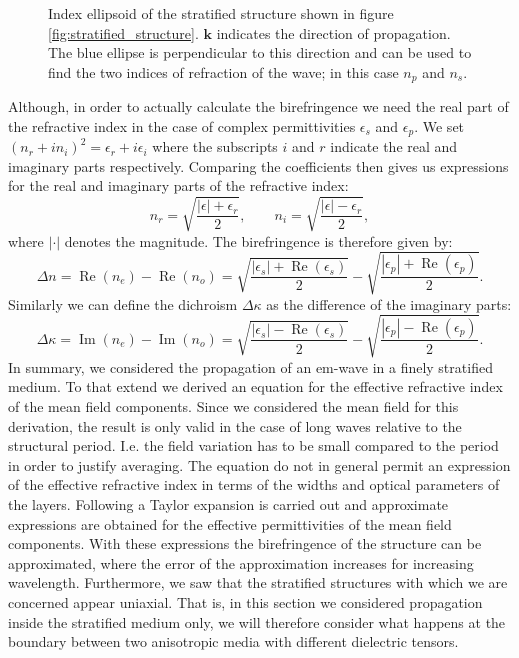 \begin{figure}[h]
    \centering
    
    \caption{Index ellipsoid of the stratified structure shown in figure \ref{fig:stratified_structure}. $\bm{k}$ indicates the direction of propagation. The blue ellipse is perpendicular to this direction and can be used to find the two indices of refraction of the wave; in this case $n_{p}$ and $n_{s}$.}
    \label{fig:index_ellipse}
\end{figure}
Although, in order to actually calculate the birefringence we need the real part of the refractive index in the case of complex permittivities $\epsilon_{s}$ and $\epsilon_{p}$. We set $(n_r+in_i)^2 = \epsilon_r + i\epsilon_i$ where the subscripts $i$ and $r$ indicate the real and imaginary parts respectively. Comparing the coefficients then gives us expressions for the real and imaginary parts of the refractive index:
\begin{equation}
    n_r = \sqrt{\frac{|\epsilon|+\epsilon_r}{2}}, 
    \qquad 
    n_i = \sqrt{\frac{|\epsilon|-\epsilon_r}{2}},
\end{equation}
where $|\cdot|$ denotes the magnitude. The birefringence is therefore given by:
\begin{equation}
    \Delta n = \operatorname{Re}(n_e) - \operatorname{Re}(n_o) = \sqrt{\frac{|\epsilon_s|+\operatorname{Re}(\epsilon_s)}{2}} - \sqrt{\frac{|\epsilon_p|+\operatorname{Re}(\epsilon_p)}{2}}.
\end{equation}
Similarly we can define the dichroism $\Delta \kappa$ as the difference of the imaginary parts:
\begin{equation}
    \Delta \kappa = \operatorname{Im}(n_e) - \operatorname{Im}(n_o) = \sqrt{\frac{|\epsilon_s|-\operatorname{Re}(\epsilon_s)}{2}} - \sqrt{\frac{|\epsilon_p|-\operatorname{Re}(\epsilon_p)}{2}}.
\end{equation}
In summary, we considered the propagation of an em-wave in a finely stratified medium. To that extend we derived an equation for the effective refractive index of the mean field components. Since we considered the mean field for this derivation, the result is only valid in the case of long waves relative to the structural period. I.e. the field variation has to be small compared to the period in order to justify averaging. The equation do not in general permit an expression of the effective refractive index in terms of the widths and optical parameters of the layers. Following a Taylor expansion is carried out and approximate expressions are obtained for the effective permittivities of the mean field components. With these expressions the birefringence of the structure can be approximated, where the error of the approximation increases for increasing wavelength. Furthermore, we saw that the stratified structures with which we are concerned appear uniaxial. That is, in this section we considered propagation inside the stratified medium only, we will therefore consider what happens at the boundary between two anisotropic media with different dielectric tensors.

